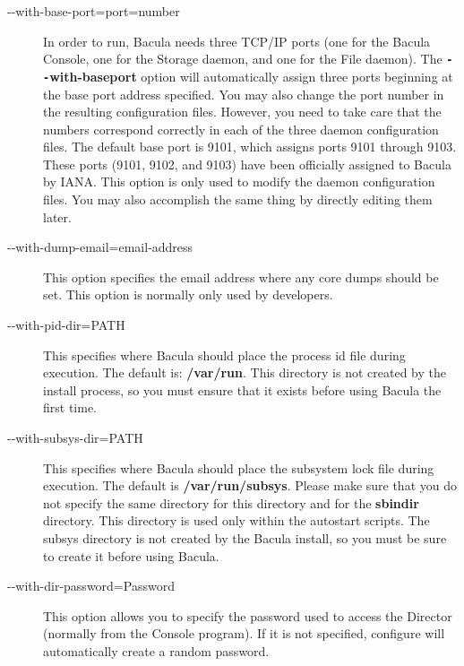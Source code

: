 \begin{description}
\item [ {-}{-}with-base-port=\lt{}port=number\gt{}]
   In order to run,  Bacula needs three TCP/IP ports (one for the Bacula 
   Console, one for the Storage daemon, and one for the File daemon).  The {\bf
   \verb:--:with-baseport} option will automatically assign three  ports beginning at
   the base port address specified. You may  also change the port number in the
   resulting configuration  files. However, you need to take care that the
   numbers  correspond correctly in each of the three daemon configuration 
   files. The default base port is 9101, which assigns ports 9101  through 9103.
   These ports (9101, 9102, and 9103) have been  officially assigned to Bacula by
   IANA.  This option is only used  to modify the daemon configuration files. You
   may also accomplish  the same thing by directly editing them later. 

\item [ {-}{-}with-dump-email=\lt{}email-address\gt{}]
   This option specifies  the email address where any core dumps should be set.
   This option  is normally only used by developers.  

\item [ {-}{-}with-pid-dir=\lt{}PATH\gt{}  ]
   This specifies where Bacula should place the process id  file during
   execution. The default is: {\bf /var/run}.  This directory is not created by
   the install process, so  you must ensure that it exists before using Bacula
   the  first time.  

\item [ {-}{-}with-subsys-dir=\lt{}PATH\gt{}]
   This specifies where Bacula should place the subsystem lock  file during
   execution. The default is {\bf /var/run/subsys}.  Please make sure that you do
   not specify the same directory  for this directory and for the {\bf sbindir}
   directory.  This directory is used only within the autostart scripts.  The
   subsys directory is not created by the Bacula install,  so you must be sure to
   create it before using Bacula. 

\item [ {-}{-}with-dir-password=\lt{}Password\gt{}]
   This option allows you to specify the password used to  access the Director
   (normally from the Console program).  If it is not specified, configure will
   automatically create a random  password.  


\end{description}
